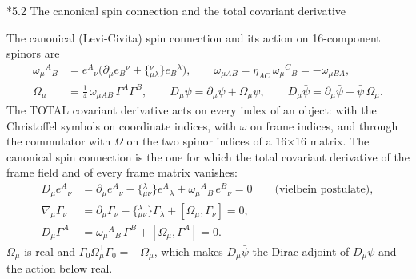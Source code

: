 \documentclass[10pt,a4paper]{article}
\makeatletter
\renewcommand\subsection{\@startsection{subsection}{2}{\z@}{-3.25ex\@plus -1ex \@minus -.2ex}{1.5ex \@plus .2ex}{\normalfont\large\bfseries\raggedright}}
\makeatother
\begin{document}
\subsection*{5.2 The canonical spin connection and the total covariant derivative}
The canonical (Levi-Civita) spin connection and its action on 16-component spinors are
\begin{align*}
\omega_\mu{}^A{}_B&=e^A{}_\nu\big(\partial_\mu e_B{}^\nu+\{{}^{\nu}_{\mu\lambda}\}e_B{}^\lambda\big),\qquad \omega_{\mu AB}=\eta_{AC}\,\omega_\mu{}^C{}_B=-\omega_{\mu BA}, \\
\Omega_\mu&=\tfrac14\,\omega_{\mu AB}\,\Gamma^A\Gamma^B,\qquad D_\mu\psi=\partial_\mu\psi+\Omega_\mu\psi,\qquad D_\mu\bar\psi=\partial_\mu\bar\psi-\bar\psi\,\Omega_\mu .
\end{align*}
The TOTAL covariant derivative acts on every index of an object: with the Christoffel symbols on coordinate indices, with $\omega$ on frame indices, and through the commutator with $\Omega$ on the two spinor indices of a 16×16 matrix. The canonical spin connection is the one for which the total covariant derivative of the frame field and of every frame matrix vanishes:
\begin{align*}
D_\mu e^A{}_\nu&=\partial_\mu e^A{}_\nu-\{{}^{\lambda}_{\mu\nu}\}e^A{}_\lambda+\omega_\mu{}^A{}_B\,e^B{}_\nu=0\qquad\text{(vielbein postulate)}, \\
\nabla_\mu\Gamma_\nu&=\partial_\mu\Gamma_\nu-\{{}^{\lambda}_{\mu\nu}\}\Gamma_\lambda+[\Omega_\mu,\Gamma_\nu]=0, \\
D_\mu\Gamma^A&=\omega_\mu{}^A{}_B\,\Gamma^B+[\Omega_\mu,\Gamma^A]=0 .
\end{align*}
$\Omega_\mu$ is real and $\Gamma_0\Omega_\mu^{\mathsf T}\Gamma_0=-\Omega_\mu$, which makes $D_\mu\bar\psi$ the Dirac adjoint of $D_\mu\psi$ and the action below real.
\end{document}
